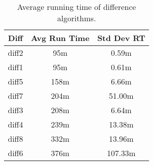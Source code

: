\begin{table}[tbph]
\begin{center}
\begin{tabular}{|c||c|c|}
\hline
Diff & Avg Run Time & Std Dev RT  \\
\hline
\hline
diff2 & 95m & 0.59m \\
diff1 & 95m & 0.61m \\
diff5 & 158m & 6.66m \\
diff7 & 204m & 51.00m \\
diff3 & 208m & 6.64m \\
diff4 & 239m & 13.38m \\
diff8 & 332m & 13.96m \\
diff6 & 376m & 107.33m \\
\hline
\end{tabular}
\end{center}
\caption{Average running time of difference algorithms.}
\label{tab:difftiming}
\end{table}
